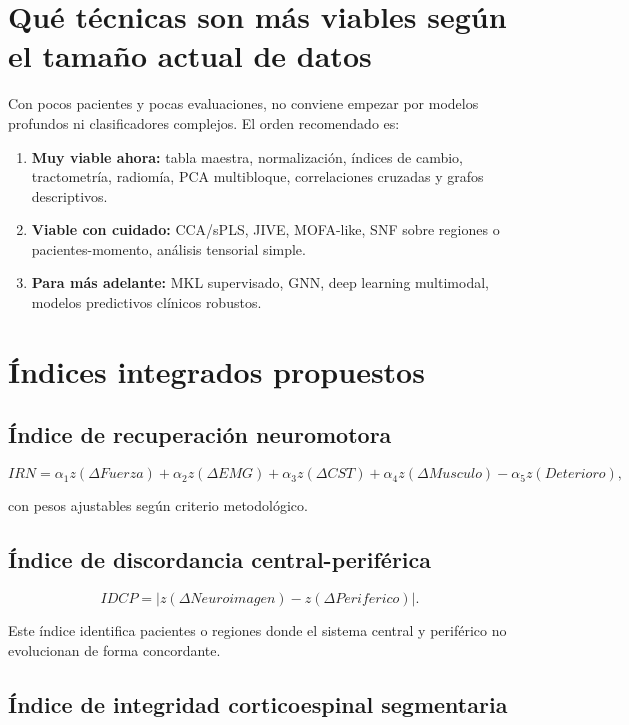 \documentclass[conference]{IEEEtran}
\begin{document}
\section{Qué técnicas son más viables según el tamaño actual de datos}
Con pocos pacientes y pocas evaluaciones, no conviene empezar por modelos profundos ni clasificadores complejos. El orden recomendado es:

\begin{enumerate}[leftmargin=*]
    \item \textbf{Muy viable ahora:} tabla maestra, normalización, índices de cambio, tractometría, radiomía, PCA multibloque, correlaciones cruzadas y grafos descriptivos.
    \item \textbf{Viable con cuidado:} CCA/sPLS, JIVE, MOFA-like, SNF sobre regiones o pacientes-momento, análisis tensorial simple.
    \item \textbf{Para más adelante:} MKL supervisado, GNN, deep learning multimodal, modelos predictivos clínicos robustos.
\end{enumerate}

\section{Índices integrados propuestos}
\subsection{Índice de recuperación neuromotora}

\begin{equation}
IRN = \alpha_1 z(\Delta Fuerza) + \alpha_2 z(\Delta EMG) + \alpha_3 z(\Delta CST) + \alpha_4 z(\Delta Musculo) - \alpha_5 z(Deterioro),
\end{equation}

con pesos ajustables según criterio metodológico.

\subsection{Índice de discordancia central-periférica}

\begin{equation}
IDCP = |z(\Delta Neuroimagen) - z(\Delta Periferico)|.
\end{equation}

Este índice identifica pacientes o regiones donde el sistema central y periférico no evolucionan de forma concordante.

\subsection{Índice de integridad corticoespinal segmentaria}
\end{document}
